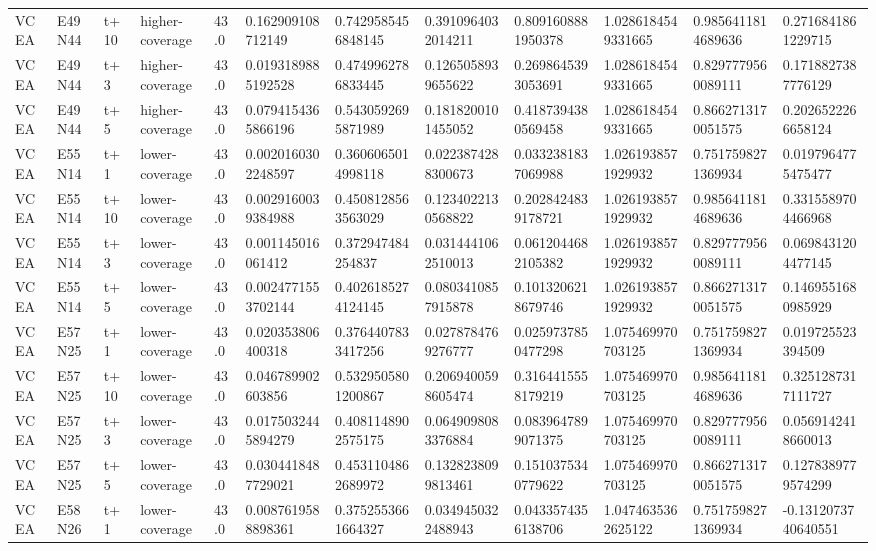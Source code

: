 \begin{landscape}
\begin{longtable}{llllllllllll}
VCEA & E49N44 & t+10 & higher-coverage & 43.0 & 0.162909108712149 & 0.7429585456848145 & 0.3910964032014211 & 0.8091608881950378 & 1.0286184549331665 & 0.9856411814689636 & 0.2716841861229715 \\
VCEA & E49N44 & t+3 & higher-coverage & 43.0 & 0.0193189885192528 & 0.4749962786833445 & 0.1265058939655622 & 0.2698645393053691 & 1.0286184549331665 & 0.8297779560089111 & 0.1718827387776129 \\
VCEA & E49N44 & t+5 & higher-coverage & 43.0 & 0.0794154365866196 & 0.5430592695871989 & 0.1818200101455052 & 0.4187394380569458 & 1.0286184549331665 & 0.8662713170051575 & 0.2026522266658124 \\
VCEA & E55N14 & t+1 & lower-coverage & 43.0 & 0.0020160302248597 & 0.3606065014998118 & 0.0223874288300673 & 0.0332381837069988 & 1.0261938571929932 & 0.7517598271369934 & 0.0197964775475477 \\
VCEA & E55N14 & t+10 & lower-coverage & 43.0 & 0.0029160039384988 & 0.4508128563563029 & 0.1234022130568822 & 0.2028424839178721 & 1.0261938571929932 & 0.9856411814689636 & 0.3315589704466968 \\
VCEA & E55N14 & t+3 & lower-coverage & 43.0 & 0.001145016061412 & 0.372947484254837 & 0.0314441062510013 & 0.0612044682105382 & 1.0261938571929932 & 0.8297779560089111 & 0.0698431204477145 \\
VCEA & E55N14 & t+5 & lower-coverage & 43.0 & 0.0024771553702144 & 0.4026185274124145 & 0.0803410857915878 & 0.1013206218679746 & 1.0261938571929932 & 0.8662713170051575 & 0.1469551680985929 \\
VCEA & E57N25 & t+1 & lower-coverage & 43.0 & 0.020353806400318 & 0.3764407833417256 & 0.0278784769276777 & 0.0259737850477298 & 1.075469970703125 & 0.7517598271369934 & 0.019725523394509 \\
VCEA & E57N25 & t+10 & lower-coverage & 43.0 & 0.046789902603856 & 0.5329505801200867 & 0.2069400598605474 & 0.3164415558179219 & 1.075469970703125 & 0.9856411814689636 & 0.3251287317111727 \\
VCEA & E57N25 & t+3 & lower-coverage & 43.0 & 0.0175032445894279 & 0.4081148902575175 & 0.0649098083376884 & 0.0839647899071375 & 1.075469970703125 & 0.8297779560089111 & 0.0569142418660013 \\
VCEA & E57N25 & t+5 & lower-coverage & 43.0 & 0.0304418487729021 & 0.4531104862689972 & 0.1328238099813461 & 0.1510375340779622 & 1.075469970703125 & 0.8662713170051575 & 0.1278389779574299 \\
VCEA & E58N26 & t+1 & lower-coverage & 43.0 & 0.0087619588898361 & 0.3752553661664327 & 0.0349450322488943 & 0.0433574356138706 & 1.0474635362625122 & 0.7517598271369934 & -0.1312073740640551 \\

\end{longtable}
\end{landscape}
